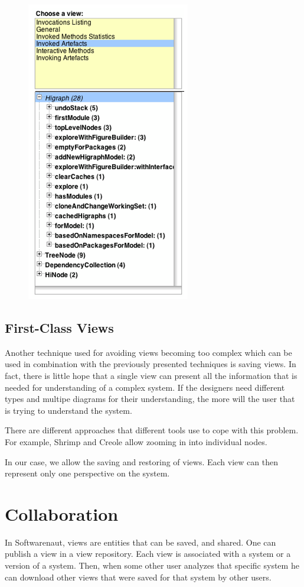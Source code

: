 \documentclass[preprint,12pt]{elsarticle}
\begin{document}
\begin{figure}[h]
\begin{center}
\includegraphics[width=0.4\linewidth]{images/DetailForEdge.png}
\caption{}
\label{}
\end{center}
\end{figure}




\subsection {First-Class Views}

Another technique used for avoiding views becoming too complex which can be used in combination with the previously presented techniques is saving views. In fact, there is little hope that a single view can present all the information that is needed for understanding of a complex system. If the designers need different types and multipe diagrams for their understanding, the more will the user that is trying to understand the system. 

There are different approaches that different tools use to cope with this problem. For example, Shrimp and Creole allow zooming in into individual nodes. 

In our case, we allow the saving and restoring of views. Each view can then represent only one perspective on the system. 



\section {Collaboration}
In Softwarenaut, views are entities that can be saved, and shared. One can publish a view in a view repository. Each view is associated with a system or a version of a system. Then, when some other user analyzes that specific system he can download other views that were saved for that system by other users. 
\end{document}
